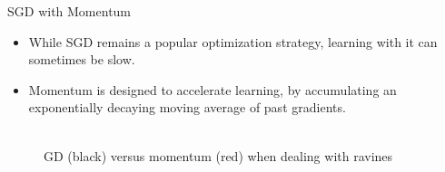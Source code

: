 
\begin{vbframe}{SGD with Momentum}
\begin{itemize}
\item While SGD remains a popular optimization strategy, learning with it can sometimes be slow.
\item Momentum is designed to accelerate learning, by accumulating an exponentially decaying moving average of past gradients.
\end{itemize}
\begin{figure}
\centering
{}
\\GD (black) versus momentum (red) when dealing with ravines
\end{figure}
\end{vbframe}

\endlecture

